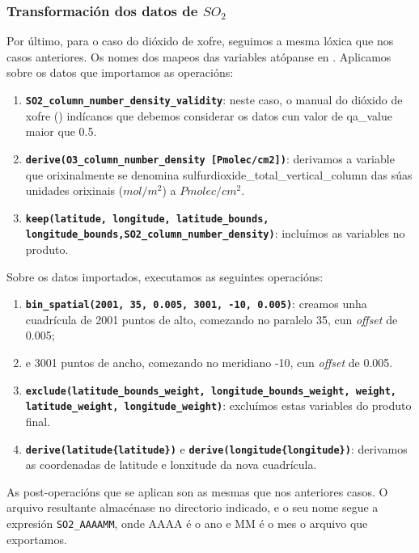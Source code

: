 \subsubsection{Transformación dos datos de $SO_2$}
Por último, para o caso do dióxido de xofre, seguimos a mesma lóxica que nos casos anteriores. Os nomes dos mapeos das variables atópanse en \cite{HARPSO2}. Aplicamos sobre os datos que importamos
as operacións:
\begin{enumerate}
    \item \texttt{\textbf{SO2\_column\_number\_density\_validity}}: neste caso, o manual do dióxido de xofre (\cite{SO2manual}) indícanos que debemos considerar os datos cun
    valor de qa\_value maior que 0.5.
    \item \texttt{\textbf{derive(O3\_column\_number\_density [Pmolec/cm2])}}: derivamos a variable que orixinalmente se denomina sulfurdioxide\_total\_vertical\_column das súas
    unidades orixinais ($mol/m^2$) a $Pmolec/cm^2$.
    \item \texttt{\textbf{keep(latitude, longitude, latitude\_bounds, longitude\_bounds,\break SO2\_column\_number\_density)}}: incluímos as variables no produto.
\end{enumerate}

Sobre os datos importados, executamos as seguintes operacións:
\begin{enumerate}
    \item \texttt{\textbf{bin\_spatial(2001, 35, 0.005, 3001, -10, 0.005)}}: creamos unha cuadrícula de 2001 puntos de alto, comezando no paralelo 35\textdegree, cun \textit{offset} de 0.005\textdegree;
    \item e 3001 puntos de ancho, comezando no meridiano -10\textdegree, cun \textit{offset} de 0.005.
    \item \texttt{\textbf{exclude(latitude\_bounds\_weight, longitude\_bounds\_weight, weight, latitude\_weight, longitude\_weight)}}: excluímos estas variables do produto final.
    \item \texttt{\textbf{derive(latitude\{latitude\})}} e  \texttt{\textbf{derive(longitude\{longitude\})}}: derivamos as coordenadas de latitude e lonxitude da nova cuadrícula.
\end{enumerate}

As post-operacións que se aplican son as mesmas que nos anteriores casos. O arquivo resultante almacénase no directorio indicado, e o seu nome segue a expresión \texttt{SO2\_AAAAMM},
onde AAAA é o ano e MM é o mes o arquivo que exportamos.



